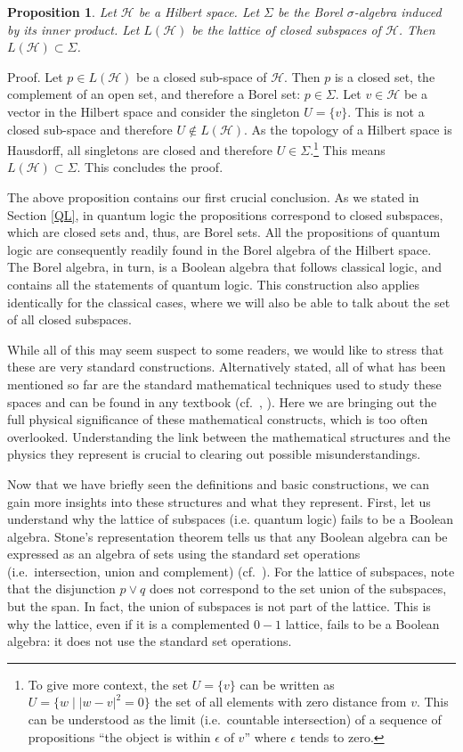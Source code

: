 \documentclass[11pt, executivepaper]{article}
\newtheorem{prop}{Proposition}
\begin{document}
\begin{prop}
	Let $\mathcal{H}$ be a Hilbert space. Let $\Sigma$ be the Borel $\sigma$-algebra induced by its inner product. Let $L(\mathcal{H})$ be the lattice of closed subspaces of $\mathcal{H}$. Then $L(\mathcal{H}) \subset \Sigma$.
\end{prop}

Proof. Let $p \in L(\mathcal{H})$ be a closed sub-space of $\mathcal{H}$. Then $p$ is a closed set, the complement of an open set, and therefore a Borel set: $p \in \Sigma$. Let $v \in \mathcal{H}$ be a vector in the Hilbert space and consider the singleton $U = \{ v \}$. This is not a closed sub-space and therefore $U \notin L(\mathcal{H})$. As the topology of a Hilbert space is Hausdorff, all singletons are closed and therefore $U \in \Sigma$.\footnote{To give more context, the set $U = \{ v \}$ can be written as $U = \{w \; | \; |w - v|^2 = 0\}$ the set of all elements with zero distance from $v$. This can be understood as the limit (i.e.\ countable intersection) of a sequence of propositions ``the object is within $\epsilon$ of $v$'' where $\epsilon$ tends to zero.} This means $L(\mathcal{H}) \subset \Sigma$. This concludes the proof.

The above proposition contains our first crucial conclusion. As we stated in Section \ref{QL}, in quantum logic the propositions correspond to closed subspaces, which are closed sets and, thus, are Borel sets. All the propositions of quantum logic are consequently readily found in the Borel algebra of the Hilbert space. The Borel algebra, in turn, is a Boolean algebra that follows classical logic, and contains all the statements of quantum logic. This construction also applies identically for the classical cases, where we will also be able to talk about the set of all closed subspaces.

While all of this may seem suspect to some readers, we would like to stress that these are very standard constructions. Alternatively stated, all of what has been mentioned so far are the standard mathematical techniques used to study these spaces and can be found in any textbook (cf.\ \cite{Rudin:1991}, \cite{Vasudeva:2017}). Here we are bringing out the full physical significance of these mathematical constructs, which is too often overlooked. Understanding the link between the mathematical structures and the physics they represent is crucial to clearing out possible misunderstandings.

Now that we have briefly seen the definitions and basic constructions, we can gain more insights into these structures and what they represent. First, let us understand why the lattice of subspaces (i.e. quantum logic) fails to be a Boolean algebra. Stone's representation theorem tells us that any Boolean algebra can be expressed as an algebra of sets using the standard set operations (i.e.\ intersection, union and complement) (cf.\ \cite{Davey:2002}). For the lattice of subspaces, note that the disjunction $p \vee q$ does not correspond to the set union of the subspaces, but the span. In fact, the union of subspaces is not part of the lattice.  This is why the lattice, even if it is a complemented $0-1$ lattice, fails to be a Boolean algebra: it does not use the standard set operations.
\end{document}
